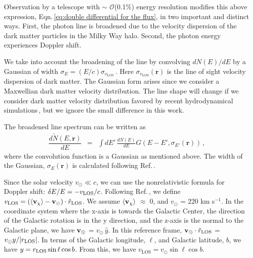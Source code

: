 \documentclass[aps,prd,10pt,twocolumn,superscriptaddress,showpacs]{revtex4-1}
\newcommand{\br}[0]{\mathbf{r}}
\newcommand{\los}[0]{\mathrm{LOS}}
\begin{document}
Observation by a telescope with $\sim$ $\mathcal{O}$(0.1\%) energy resolution modifies this above expression, Eqn.\,\ref{eq:double differential for the flux}, in two important and distinct ways.  First, the photon line is broadened due to the velocity dispersion of the dark matter particles in the Milky Way halo.  Second, the photon energy experiences Doppler shift.  

We take into account the broadening of the line by convolving $dN(E)/dE$ by a Gaussian of width
$\sigma_E = (E/c) \sigma_{v_\los}$\,\cite{speckhard2016}.  Here $\sigma_{v_\los}(\br)$ 
is the line of sight velocity dispersion of dark matter.  The Gaussian form arises 
since we consider a Maxwellian dark matter velocity distribution.  The line shape will change if we 
consider dark matter velocity distribution favored by recent hydrodynamical simulations\,\cite{Bozorgnia:2016ogo,Sloane:2016kyi,Kelso:2016qqj}, 
but we ignore the small difference in this work.  

The broadened line spectrum can be written as 
\begin{eqnarray}
	\dfrac{d \tilde{N} (E, \br)}{dE} &=& \int dE' \, \frac{dN(E)}{dE}  G(E - E', \sigma_{E'} (\br)) \, ,
\label{eq:formula for modified dNdE}
\end{eqnarray}
where the convolution function is a Gaussian as mentioned above.  The width of the Gaussian,
$\sigma_E(\br)$ is calculated following Ref.\,\cite{speckhard2016}.

Since the solar velocity $v_\odot \ll c$, we can use the nonrelativistic formula for Doppler shift: $\delta
E/E = - v_{\rm LOS}/c$.  Following Ref.\,\cite{speckhard2016}, we define $v_{\rm LOS} = (\langle
{\bf v}_\chi \rangle - {\bf v}_\odot) \cdot \hat{r}_{\rm LOS}$.  We assume $\langle {\bf v}_\chi
\rangle$ $\approx$ 0, and $v_\odot$ = 220 km s$^{-1}$.  In the coordinate system where the x-axis is
towards the Galactic Center, the direction of the Galactic rotation is in the y direction, and the
z-axis is the normal to the Galactic plane, we have ${\bf v}_\odot$ = $v_\odot \, \hat{y}$.  In this
reference frame, ${\bf v}_\odot \cdot \hat{r}_{\rm LOS}$ = $v_\odot y / |r_{\rm LOS}|$.  In terms of
the Galactic longitude, $\ell$, and Galactic latitude, $b$, we have $y = r_{\rm LOS} \, {\rm sin} \,
\ell \, {\rm cos} \, b$.  From this, we have $v_\los = v_\odot \sin \ell\cos b$.
\end{document}
